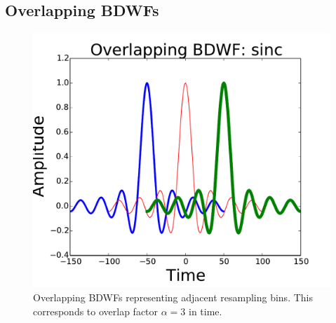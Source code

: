 \documentclass[useAMS,usenatbib]{mn2e}
\newcommand{\OMS}[1]{\textcolor{red}{{\bf OMS: #1}}}
\newcommand{\ATM}[1]{\textcolor{blue}{{\bf Marcellin: #1}}}
\newcommand{\GSF}[1]{\textcolor{red}{{\bf GSF: #1}}}
\begin{document}



\subsection{Overlapping BDWFs}
\label{baseline2}
\newcommand{\WF}[3]{{#1}-$#2${}$\times${}$#3$}
\begin{figure} 
\includegraphics[width=\columnwidth]{./Figures/corrSigVLAMxBl_overlapGdelta.pdf}\caption{Overlapping 
BDWFs representing adjacent resampling bins. This corresponds to overlap factor $\alpha=3$ in time.
}\label{fig:overlap}
\end{figure}
\end{document}
